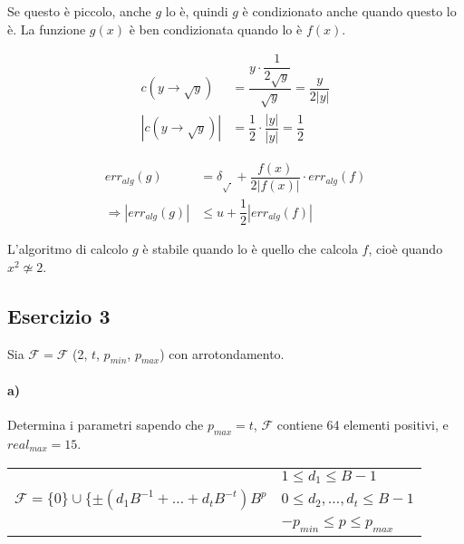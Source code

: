 Se questo è piccolo, anche $g$ lo è, quindi $g$ è condizionato anche quando questo lo è. La funzione $g(x)$ è ben condizionata quando lo è $f(x)$.

\begin{equation*}
\begin{split}
  c(y\rightarrow \sqrt{y}) &= \dfrac{y\cdot \dfrac{1}{2\sqrt{y}}}{\sqrt{y}} = \dfrac{y}{2|y|}\\[1.5ex]
  |c(y\rightarrow \sqrt{y})| &= \dfrac{1}{2}\cdot \dfrac{|y|}{|y|} = \dfrac{1}{2}
\end{split}
\end{equation*}

\begin{equation*}
\begin{split}
  err_{alg}(g) &= \delta_{\sqrt{~}} + \dfrac{f(x)}{2|f(x)|}\cdot err_{alg}(f)\\[1.5ex]
  \Rightarrow |err_{alg}(g)| &\leq u+\dfrac{1}{2} |err_{alg}(f)|
\end{split}
\end{equation*}

L'algoritmo di calcolo $g$ è stabile quando lo è quello che calcola $f$, cioè quando $x^2\not\simeq 2$.


\subsection{Esercizio 3}

Sia $\mathcal{F} = \mathcal{F}$ (2, $t$, $p_{min}$, $p_{max}$) con arrotondamento.


\paragraph{a)} Determina i parametri sapendo che $p_{max}=t$, $\mathcal{F}$ contiene 64 elementi positivi, e $real_{max}=15$.

\begin{table}[H]
\centering
\begin{tabular}{l|l}
                                                              & $1\leq d_1\leq B-1$             \\
$\mathcal{F}=\{0\}\cup \{\pm(d_1B^{-1}+\ldots +d_tB^{-t})B^p$ & $0\leq d_2,\ldots ,d_t\leq B-1$ \\
                                                              & $-p_{min}\leq p\leq p_{max}$   
\end{tabular}
\end{table}

